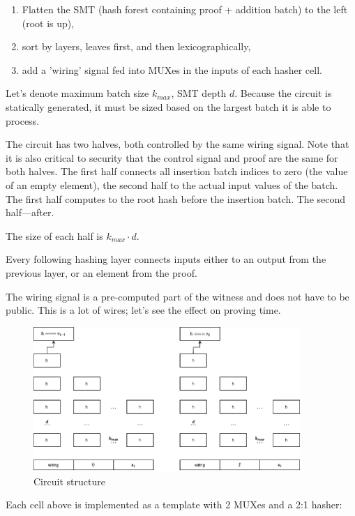 \documentclass[twocolumn]{article}
\begin{document}
\begin{enumerate}
    \item Flatten the SMT (hash forest containing proof + addition batch) to the left (root is up),
    \item sort by layers, leaves first, and then lexicographically,
    \item add a 'wiring' signal fed into MUXes in the inputs of each hasher cell.
\end{enumerate}

Let's denote maximum batch size $k_{max}$, SMT depth $d$. Because the circuit is statically generated, it must be sized based on the largest batch it is able to process.

The circuit has two halves, both controlled by the same wiring signal. Note that it is also critical to security that the control signal and proof are the same for both halves. The first half connects all insertion batch indices to zero (the value of an empty element), the second half to the actual input values of the batch.
The first half computes to the root hash before the insertion batch. The second half---after.

The size of each half is $k_{max} \cdot d$.

Every following hashing layer connects inputs either to an output from the previous layer, or an element from the proof.

The wiring signal is a pre-computed part of the witness and does not have to be public. This is a lot of wires; let's see the effect on proving time.

\begin{figure}[!t]
    \centering
    \includegraphics[width=0.9\textwidth]{pic/smt-circuit.drawio}
    \caption{Circuit structure}\label{fi:smt-circuit}
\end{figure}

Each cell above is implemented as a template with 2 MUXes and a 2:1 hasher:
\end{document}
